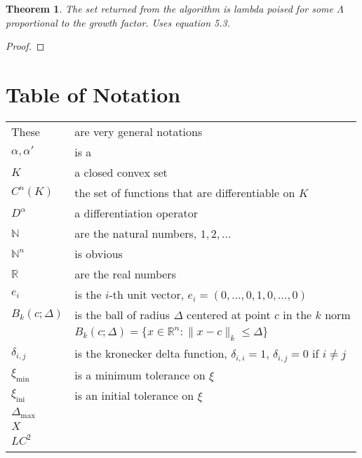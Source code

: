 \documentclass{article}
\newtheorem{theorem}{Theorem}[section]
\theoremstyle{case}
\newcommand{\naturals}{\mathbb N}
\newcommand{\natsn}{\naturals^n}
\newcommand{\reals}{\mathbb R}
\newcommand{\ximin}{{\xi_{\textrm{min}}}}
\newcommand{\xiini}{{\xi_{\textrm{ini}}}}
\newcommand{\domain}{{X}}
\newcommand{\dmax}{{\Delta_{\textrm{max}}}}
\begin{document}
\begin{theorem}
The set returned from the algorithm is lambda poised for some $\Lambda$ proportional to the growth factor.
Uses equation 5.3.
\end{theorem}

\begin{proof}
\end{proof}





\section{Table of Notation}
\begin{longtable}{| p{} | p{} |}
These & are very general notations \\   %
$\alpha, \alpha'$ & is a \\
$K$ & a closed convex set \\
$C^n(K)$ & the set of functions that are differentiable on $K$ \\
$D^{\alpha}$ & a differentiation operator \\
$ \naturals $ & are the natural numbers, $1, 2, \ldots$ \\
$ \natsn $ & is obvious \\
$ \reals $ & are the real numbers \\
$e_i$ & is the $i$-th unit vector, $e_i = (0, \ldots, 0, 1, 0, \ldots, 0)$ \\
$B_k(c; \Delta)$ & is the ball of radius $\Delta$ centered at point $c$ in the $k$ norm\\
& $B_k(c;\Delta) = \{ x \in \mathbb{R}^n : \| x - c\|_k \le \Delta \}$ \\
$\delta_{i,j}$ & is the kronecker delta function, $\delta_{i,i} = 1$, $\delta_{i,j} = 0$ if $i\ne j$ \\
$\ximin$ & is a minimum tolerance on $\xi$ \\
$\xiini$ & is an initial tolerance on $\xi$ \\
$\dmax$ & \\
$\domain$ & \\
$LC^2$ & \\
\label{tab:TableOfNotation}
\end{longtable}


\newpage




\end{document}
